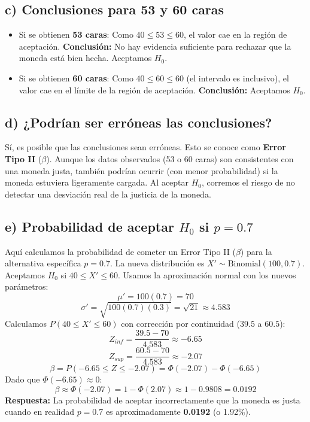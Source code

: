 \documentclass[12pt]{article}
\begin{document}
\subsection*{c) Conclusiones para 53 y 60 caras}
\begin{itemize}
    \item Si se obtienen \textbf{53 caras}: Como $40 \le 53 \le 60$, el valor cae en la región de aceptación. \textbf{Conclusión:} No hay evidencia suficiente para rechazar que la moneda está bien hecha. Aceptamos $H_0$.
    \item Si se obtienen \textbf{60 caras}: Como $40 \le 60 \le 60$ (el intervalo es inclusivo), el valor cae en el límite de la región de aceptación. \textbf{Conclusión:} Aceptamos $H_0$.
\end{itemize}

\subsection*{d) ¿Podrían ser erróneas las conclusiones?}
Sí, es posible que las conclusiones sean erróneas. Esto se conoce como \textbf{Error Tipo II} ($\beta$).
Aunque los datos observados (53 o 60 caras) son consistentes con una moneda justa, también podrían ocurrir (con menor probabilidad) si la moneda estuviera ligeramente cargada. Al aceptar $H_0$, corremos el riesgo de no detectar una desviación real de la justicia de la moneda.

\subsection*{e) Probabilidad de aceptar $H_0$ si $p=0.7$}
Aquí calculamos la probabilidad de cometer un Error Tipo II ($\beta$) para la alternativa específica $p=0.7$.
La nueva distribución es $X' \sim \text{Binomial}(100, 0.7)$.
Aceptamos $H_0$ si $40 \le X' \le 60$.
Usamos la aproximación normal con los nuevos parámetros:
$$ \mu' = 100(0.7) = 70 $$
$$ \sigma' = \sqrt{100(0.7)(0.3)} = \sqrt{21} \approx 4.583 $$
Calculamos $P(40 \le X' \le 60)$ con corrección por continuidad ($39.5$ a $60.5$):
$$ Z_{inf} = \frac{39.5 - 70}{4.583} \approx -6.65 $$
$$ Z_{sup} = \frac{60.5 - 70}{4.583} \approx -2.07 $$
$$ \beta = P(-6.65 \le Z \le -2.07) = \Phi(-2.07) - \Phi(-6.65) $$
Dado que $\Phi(-6.65) \approx 0$:
$$ \beta \approx \Phi(-2.07) = 1 - \Phi(2.07) \approx 1 - 0.9808 = 0.0192 $$
\textbf{Respuesta:} La probabilidad de aceptar incorrectamente que la moneda es justa cuando en realidad $p=0.7$ es aproximadamente \textbf{0.0192} (o 1.92\%).
\end{document}
